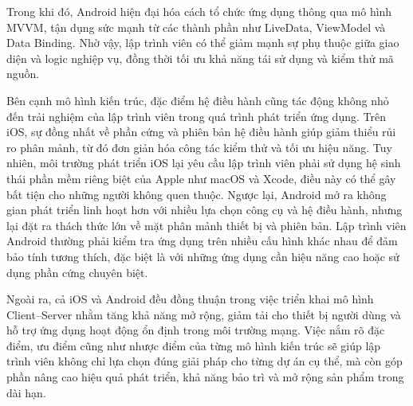         \vspace{0.5em}
    
        \hspace*{0.8cm}Trong khi đó, Android hiện đại hóa cách tổ chức ứng dụng thông qua mô hình MVVM, tận dụng sức mạnh từ các thành phần như LiveData, ViewModel và Data Binding. Nhờ vậy, lập trình viên có thể giảm mạnh sự phụ thuộc giữa giao diện và logic nghiệp vụ, đồng thời tối ưu khả năng tái sử dụng và kiểm thử mã nguồn. 

        \vspace{0.5em}
        
        \hspace*{0.8cm}Bên cạnh mô hình kiến trúc, đặc điểm hệ điều hành cũng tác động không nhỏ đến trải nghiệm của lập trình viên trong quá trình phát triển ứng dụng. Trên iOS, sự đồng nhất về phần cứng và phiên bản hệ điều hành giúp giảm thiểu rủi ro phân mảnh, từ đó đơn giản hóa công tác kiểm thử và tối ưu hiệu năng. Tuy nhiên, môi trường phát triển iOS lại yêu cầu lập trình viên phải sử dụng hệ sinh thái phần mềm riêng biệt của Apple như macOS và Xcode, điều này có thể gây bất tiện cho những người không quen thuộc. Ngược lại, Android mở ra không gian phát triển linh hoạt hơn với nhiều lựa chọn công cụ và hệ điều hành, nhưng lại đặt ra thách thức lớn về mặt phân mảnh thiết bị và phiên bản. Lập trình viên Android thường phải kiểm tra ứng dụng trên nhiều cấu hình khác nhau để đảm bảo tính tương thích, đặc biệt là với những ứng dụng cần hiệu năng cao hoặc sử dụng phần cứng chuyên biệt.
        
        \vspace{0.5em}

        \hspace*{0.8cm}Ngoài ra, cả iOS và Android đều đồng thuận trong việc triển khai mô hình Client–Server nhằm tăng khả năng mở rộng, giảm tải cho thiết bị người dùng và hỗ trợ ứng dụng hoạt động ổn định trong môi trường mạng. Việc nắm rõ đặc điểm, ưu điểm cũng như nhược điểm của từng mô hình kiến trúc sẽ giúp lập trình viên không chỉ lựa chọn đúng giải pháp cho từng dự án cụ thể, mà còn góp phần nâng cao hiệu quả phát triển, khả năng bảo trì và mở rộng sản phẩm trong dài hạn.
    
